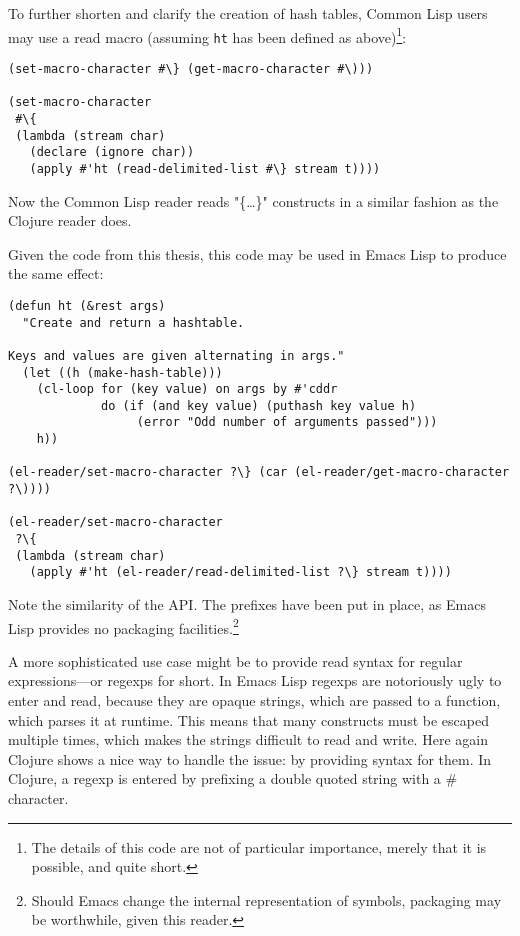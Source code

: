 \documentclass[a4paper]{article}
\newcommand{\el}{Emacs Lisp}
\newcommand{\cl}{Common Lisp}
\newcommand{\fun}[1]{\texttt{#1}}
\begin{document}
To further shorten and clarify the creation of hash tables, \cl{} users may use
a read macro (assuming \fun{ht} has been defined as above)\footnote{The details
  of this code are not of particular importance, merely that it is possible, and
  quite short.}:

\begin{verbatim}
(set-macro-character #\} (get-macro-character #\)))

(set-macro-character
 #\{
 (lambda (stream char)
   (declare (ignore char))
   (apply #'ht (read-delimited-list #\} stream t))))
\end{verbatim}

Now the \cl{} reader reads "\{\ldots{}\}" constructs in a similar fashion as the
Clojure reader does.

Given the code from this thesis, this code may be used in \el{} to produce the
same effect:

\begin{verbatim}
(defun ht (&rest args)
  "Create and return a hashtable.

Keys and values are given alternating in args."
  (let ((h (make-hash-table)))
    (cl-loop for (key value) on args by #'cddr
             do (if (and key value) (puthash key value h)
                  (error "Odd number of arguments passed")))
    h))

(el-reader/set-macro-character ?\} (car (el-reader/get-macro-character ?\))))

(el-reader/set-macro-character
 ?\{
 (lambda (stream char)
   (apply #'ht (el-reader/read-delimited-list ?\} stream t))))
\end{verbatim}

Note the similarity of the API.  The prefixes have been put in place, as \el{}
provides no packaging facilities.\footnote{Should Emacs change the internal
  representation of symbols, packaging may be worthwhile, given this reader.}

A more sophisticated use case might be to provide read syntax for regular
expressions---or regexps for short.  In \el{} regexps are notoriously ugly to
enter and read, because they are opaque strings, which are passed to a function,
which parses it at runtime.  This means that many constructs must be escaped
multiple times, which makes the strings difficult to read and write.  Here again
Clojure shows a nice way to handle the issue: by providing syntax for them.  In
Clojure, a regexp is entered by prefixing a double quoted string with a \#
character.
\end{document}
